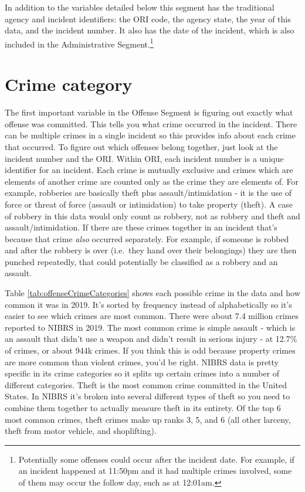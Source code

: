\documentclass[
]{krantz}
\begin{document}
In addition to the variables detailed below this segment has
the traditional agency and incident identifiers: the ORI
code, the agency state, the year of this data, and the
incident number. It also has the date of the incident, which
is also included in the Administrative Segment.\footnote{Potentially
  some offenses could occur after the incident date. For
  example, if an incident happened at 11:50pm and it had
  multiple crimes involved, some of them may occur the
  follow day, such as at 12:01am.}

\section{Crime category}\label{crime-category}

The first important variable in the Offense Segment is
figuring out exactly what offense was committed. This tells
you what crime occurred in the incident. There can be
multiple crimes in a single incident so this provides info
about each crime that occurred. To figure out which offenses
belong together, just look at the incident number and the
ORI. Within ORI, each incident number is a unique identifier
for an incident. Each crime is mutually exclusive and crimes
which are elements of another crime are counted only as the
crime they are elements of. For example, robberies are
basically theft plus assault/intimidation - it is the use of
force or threat of force (assault or intimidation) to take
property (theft). A case of robbery in this data would only
count as robbery, not as robbery and theft and
assault/intimidation. If there are these crimes together in
an incident that's because that crime \emph{also} occurred
separately. For example, if someone is robbed and after the
robbery is over (i.e.~they hand over their belongings) they
are then punched repeatedly, that could potentially be
classified as a robbery and an assault.

Table \ref{tab:offenseCrimeCategories} shows each possible
crime in the data and how common it was in 2019. It's sorted
by frequency instead of alphabetically so it's easier to see
which crimes are most common. There were about 7.4 million
crimes reported to NIBRS in 2019. The most common crime is
simple assault - which is an assault that didn't use a
weapon and didn't result in serious injury - at 12.7\% of
crimes, or about 944k crimes. If you think this is odd
because property crimes are more common than violent crimes,
you'd be right. NIBRS data is pretty specific in its crime
categories so it splits up certain crimes into a number of
different categories. Theft is the most common crime
committed in the United States. In NIBRS it's broken into
several different types of theft so you need to combine them
together to actually measure theft in its entirety. Of the
top 6 most common crimes, theft crimes make up ranks 3, 5,
and 6 (all other larceny, theft from motor vehicle, and
shoplifting).
\end{document}
